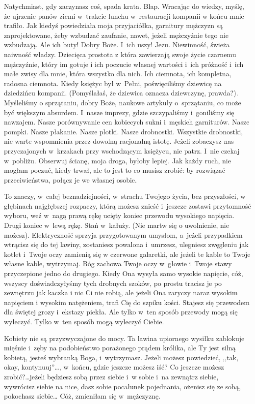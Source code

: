 \documentclass[oneside,polish,12pt,sfheadings]{mwbk}
\begin{document}
Natychmiast, gdy zaczynasz coś, spada krata. Blap. Wracając do wiedzy,
myślę, że ujrzenie panów ziemi w~trakcie lunchu w~restauracji kompanii
w końcu mnie trafiło. Jak kiedyś powiedziała moja przyjaciółka, garnitury
mężczyzn są zaprojektowane, żeby wzbudzać zaufanie, nawet, jeżeli
mężczyźnie tego nie wzbudzają. Ale ich buty! Dobry Boże. I~ich
uszy! Jezu. Niewinność, świeża naiwność władzy. Dziecięca prostota
z która zawierzają swoje życie czarnemu mężczyźnie, który im gotuje
i ich poczucie własnej wartości i~ich próżność i~ich małe zwisy dla
mnie, która wszystko dla nich. Ich ciemnota, ich kompletna, radosna
ciemnota. Kiedy księżyc był w~Pełni, poświęciliśmy dziewicę na dziedzińcu
kompanii. (Pomyślałaś, że dziewica oznacza dziewczynę, prawda?). Myśleliśmy
o sprzątaniu, dobry Boże, naukowe artykuły o~sprzątaniu, co może być
większym absurdem. I~nasze imprezy, gdzie szczypaliśmy i~goniliśmy
się nawzajem. Nasze porównywanie cen kobiecych sukni i~męskich garniturów.
Nasze pompki. Nasze płakanie. Nasze plotki. Nasze drobnostki. Wszystkie
drobnostki, nie warte wspomnienia przez dowolną racjonalną istotę.
Jeżeli zobaczysz nas przyczajonych w~krzakach przy wschodzącym księżycu,
nie patrz. I~nie czekaj w~pobliżu. Obserwuj ścianę, moja droga, byłoby
lepiej. Jak każdy ruch, nie mogłam poczuć, kiedy trwał, ale to jest
to co musisz zrobić: by rozwiązać przeciwieństwa, połącz je we własnej
osobie.

To znaczy, w~całej beznadziejności, w~strachu Twojego życia, bez przyszłości,
w głębinach najgłębszej rozpaczy, którą możesz znieść i~jeszcze zostawi
przytomność wyboru, weź w~nagą prawą rękę ucięty koniec przewodu wysokiego
napięcia. Drugi koniec w~lewą rękę. Stań w~kałuży. (Nie martw się
o uwolnienie, nie możesz). Elektryczność sprzyja przygotowanym umysłom,
a~jeżeli przypadkiem wtrącisz się do tej lawiny, zostaniesz powalona
i~umrzesz, ulegniesz zwęgleniu jak kotlet i~Twoje oczy zamienią się
w czerwone galaretki, ale jeżeli te kable to Twoje własne kable, wytrzymaj.
Bóg zachowa Twoje oczy w~głowie i~Twoje stawy przyczepione jedno do
drugiego. Kiedy Ona wysyła samo wysokie napięcie, cóż, wszyscy doświadczyłyśmy
tych drobnych szoków, po prostu tracisz je po zewnętrzu jak kaczka
i nic Ci nie robią, ale jeżeli Ona zaryczy naraz wysokim napięciem
i wysokim natężeniem, trafi Cię do szpiku kości. Stajesz się przewodem
dla świętej grozy i~ekstazy piekła. Ale tylko w~ten sposób przewody
mogą się wyleczyć. Tylko w~ten sposób mogą wyleczyć Ciebie.

Kobiety nie są przyzwyczajone do mocy. Ta lawina upiornego wysiłku
zablokuje mięśnie i~zęby na podobieństwo porażonego prądem królika,
ale Ty jest silną kobietą, jesteś wybranką Boga, i~wytrzymasz. Jeżeli
możesz powiedzieć, ,,tak, okay, kontynuuj''\ldots, w~końcu, gdzie jeszcze
możesz iść? Co jeszcze możesz zrobić?\ldots jeżeli będziesz sobą przez
siebie i~w sobie i~na zewnątrz siebie, wywrócisz siebie na nice, dasz
sobie pocałunek pojednania, ożenisz się ze sobą, pokochasz siebie\ldots
Cóż, zmieniłam się w~mężczyznę.
\end{document}
